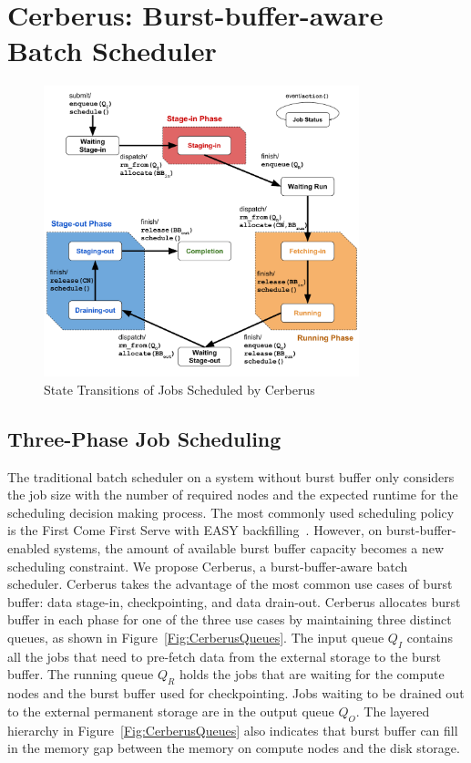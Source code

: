 \section{Cerberus: Burst-buffer-aware Batch Scheduler}
\label{Sec:Scheduler}

\begin{figure}[htp]
\centering
        \includegraphics[width=3.6in]{3PhaseJobFSM}
        \caption{State Transitions of Jobs Scheduled by Cerberus}
\label{Fig:JobFSM}
\end{figure}

\subsection{Three-Phase Job Scheduling}

The traditional batch scheduler on a system without burst buffer only considers the job size with the number of required nodes and the expected runtime for the scheduling decision making process. The most commonly used scheduling policy is the First Come First Serve with EASY backfilling~\cite{tsafrir-tpds-2007}.
However, on burst-buffer-enabled systems, the amount of available burst buffer capacity becomes a new scheduling constraint.
We propose Cerberus, a burst-buffer-aware batch scheduler. Cerberus takes the advantage of the most common use cases of burst buffer: data stage-in, checkpointing, and data drain-out. Cerberus allocates burst buffer in each phase for one of the three use cases by maintaining three distinct queues, as shown in Figure~\ref{Fig:CerberusQueues}.
The input queue $Q_I$ contains all the jobs that need to pre-fetch data from the external storage to the burst buffer.
The running queue $Q_R$ holds the jobs that are waiting for the compute nodes and the burst buffer used for checkpointing.
Jobs waiting to be drained out to the external permanent storage are in the output queue $Q_O$.
The layered hierarchy in Figure~\ref{Fig:CerberusQueues} also indicates that burst buffer can fill in the memory gap between the memory on compute nodes and the disk storage.

